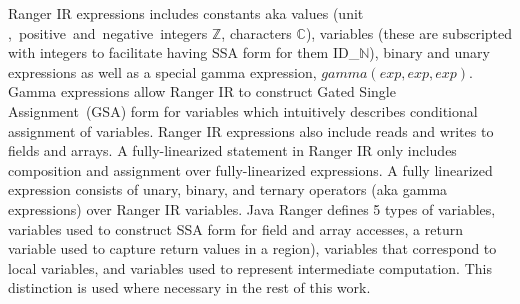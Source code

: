 Ranger IR expressions includes constants aka values (unit \unit, positive and negative integers $\mathbb{Z}$, characters
$\mathbb{C}$), variables (these are subscripted with integers to facilitate having SSA form for them ID_$\mathbb{N}$),
binary and unary expressions as well as a special gamma expression, $gamma(exp, exp, exp)$. Gamma expressions allow
Ranger IR to construct Gated Single Assignment~(GSA)\cite{Ottenstein1990} form for variables which intuitively describes conditional
assignment of variables. Ranger IR expressions also include reads and writes to fields and arrays.
%
A fully-linearized statement in Ranger IR only includes composition and assignment over fully-linearized expressions.
%
A fully linearized expression consists of unary, binary, and ternary operators (aka gamma expressions) over Ranger IR
variables.
%
Java Ranger defines 5 types of variables, variables used to construct SSA form for field and array accesses, a return
variable used to capture return values in a region), variables that correspond to local variables, and variables used to
represent intermediate computation.
%
This distinction is used where necessary in the rest of this work.
%
%
%
%
%


